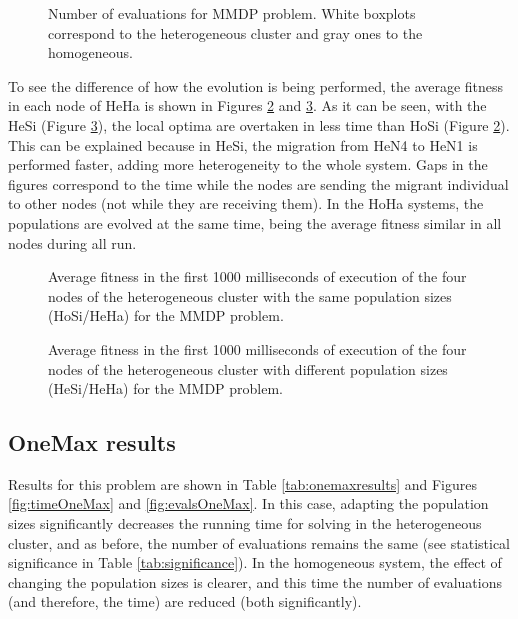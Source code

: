 \documentclass[final,1p,times]{elsarticle}
\begin{document}
\begin{figure}[htb]
\centering
{}
\caption{Number of evaluations for MMDP problem. White boxplots correspond to the heterogeneous cluster and gray ones to the homogeneous.}
\label{fig:evalsMMDP}
\end{figure}

To see the difference of how the evolution is being performed, the average fitness in each node of HeHa is shown in Figures \ref{fig:hosiheha} and \ref{fig:hesiheha}. As it can be seen, with the HeSi (Figure \ref{fig:hesiheha}), the local optima are overtaken in less time than HoSi (Figure \ref{fig:hosiheha}).  This can be explained because in HeSi, the migration from HeN4 to HeN1 is performed faster, adding more heterogeneity to the whole system. Gaps in the figures correspond to the time while the nodes are sending the migrant individual to other nodes (not while they are receiving them). In the HoHa systems, the populations are evolved at the same time, being the average fitness similar in all nodes during all run. %


\begin{figure}[htb]
\centering
{}
\caption{Average fitness in the first 1000 milliseconds of execution of the four nodes of the heterogeneous cluster with the same population sizes (HoSi/HeHa) for the MMDP problem.}
\label{fig:hosiheha}
\end{figure}

\begin{figure}[htb]
\centering
{} %
\caption{Average fitness in the first 1000 milliseconds of execution of the four nodes of the heterogeneous cluster with different population sizes (HeSi/HeHa) for the MMDP problem.}
\label{fig:hesiheha}
\end{figure}



\subsection{OneMax results}

Results for this problem are shown in Table \ref{tab:onemaxresults} and Figures  \ref{fig:timeOneMax} and \ref{fig:evalsOneMax}. In this case, adapting the population sizes significantly decreases  the running time for solving in the heterogeneous cluster, and as before, the number of evaluations remains the same (see statistical significance in Table \ref{tab:significance}). In the homogeneous system, the effect of changing the population sizes is clearer, and this time the number of evaluations (and therefore, the time) are reduced (both significantly). 
\end{document}
